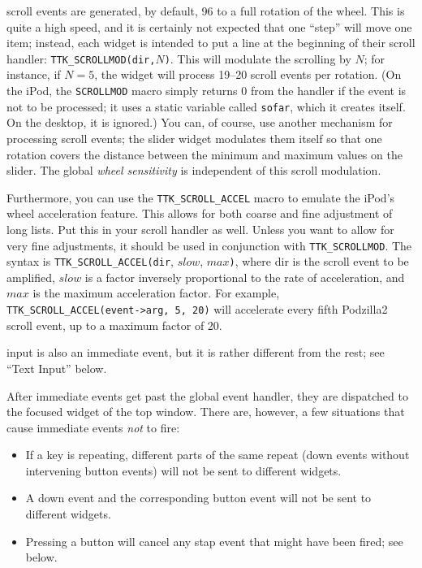 \documentclass[12pt,letterpaper]{report}
\begin{document}
{\sf scroll} events are generated, by default, 96 to a full rotation of the wheel. This is quite
a high speed, and it is certainly not expected that one ``step'' will move one item; instead,
each widget is intended to put a line at the beginning of their scroll handler:
\verb|TTK_SCROLLMOD(dir,|$N$\verb|)|. This will modulate the scrolling by $N$; for instance, if 
$N = 5$, the widget will process 19--20 scroll events per rotation. (On the iPod, the \verb|SCROLLMOD|
macro simply returns 0 from the handler if the event is not to be processed; it uses a static variable
called \verb|sofar|, which it creates itself. On the desktop, it is ignored.) You can, of course,
use another mechanism for processing scroll events; the slider widget modulates them itself so
that one rotation covers the distance between the minimum and maximum values on the slider.
The global {\sl wheel sensitivity} is independent of this scroll modulation.

Furthermore, you can use the \verb|TTK_SCROLL_ACCEL| macro to emulate the iPod's wheel acceleration
feature.  This allows for both coarse and fine adjustment of long lists.  Put this in your scroll 
handler as well. Unless you want to allow for very fine adjustments, it should be used in 
conjunction with \verb|TTK_SCROLLMOD|.  The syntax is 
\verb|TTK_SCROLL_ACCEL(dir|, $slow$, $max$\verb|)|, where dir is the scroll event to be amplified,
$slow$ is a factor inversely proportional to the rate of acceleration, and $max$ is the maximum 
acceleration factor.  For example, \verb|TTK_SCROLL_ACCEL(event->arg, 5, 20)| will accelerate every 
fifth {\sf Podzilla2 scroll} event, up to a maximum factor of 20.

{\sf input} is also an immediate event, but it is rather different from the rest; see ``Text Input'' below.

After immediate events get past the global event handler, they are dispatched to the focused widget
of the top window. There are, however, a few situations that cause immediate events \emph{not} to fire:
\begin{itemize}
\item If a key is repeating, different parts of the same repeat ({\sf down} events without intervening {\sf button} events)
will not be sent to different widgets.
\item A {\sf down} event and the corresponding {\sf button} event will not be sent to different widgets.
\item Pressing a button will cancel any {\sf stap} event that might have been fired; see below.
\end{itemize}
\end{document}
